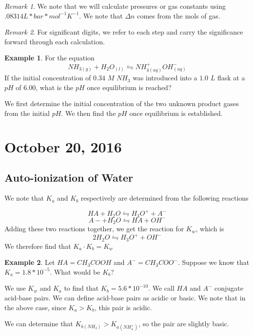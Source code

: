 \documentclass[11pt]{article}
\theoremstyle{plain} %
\theoremstyle{definition}
\theoremstyle{example}
\newtheorem*{example}{Example}
\theoremstyle{remark}
\newtheorem*{remark}{Remark}
\begin{document}
\begin{remark}
We note that we will calculate pressures or gas constants using $.08314 L*bar*mol^{-1}K^{-1}$. We note that $\Delta n$ comes from the mols of gas.
\end{remark}

\begin{remark}
For significant digits, we refer to each step and carry the significance forward through each calculation.
\end{remark}

\begin{example}
For the equation $$NH_{3(g)} + H_2O_{(l)} \leftrightharpoons NH_{4(aq)}^+ OH^-_{(aq)}$$
If the initial concentration of $0.34$ $M $ $NH_3$ was introduced into a $1.0 $ $L$ flask at a $pH$ of $6.00$, what is the $pH$ once equilibrium is reached?
\end{example}

We first determine the initial concentration of the two unknown product gases from the initial $pH$. We then find the $pH$ once equilibrium is established.

\section{October 20, 2016}
\subsection{Auto-ionization of Water}

We note that $K_a$ and $K_b$ respectively are determined from the following reactions

$$HA + H_2O \leftrightharpoons H_3O^+ + A^-$$
$$A- + H_2O \leftrightharpoons HA + OH^- $$
Adding these two reactions together, we get the reaction for $K_w$, which is
$$ 2H_2O \leftrightharpoons H_3O^+ + OH^-$$
We therefore find that $K_a \cdot K_b = K_w$

\begin{example}
Let $HA = CH_3COOH$ and $A^- = CH_3COO^-$. Suppose we know that $K_a = 1.8*10^{-5}$. What would be $K_b$?
\end{example}

We use $K_w$ and $K_a$ to find that $K_b = 5.6*10^{-10}$. We call $HA$ and $A^-$ conjugate acid-base pairs. We can define acid-base pairs as acidic or basic. We note that in the above case, since $K_a > K_b$, this pair is acidic. 

We can determine that $K_{b(NH_3)} > K_{a(NH_4^+)}$, so the pair are slightly basic. 
\end{document}
